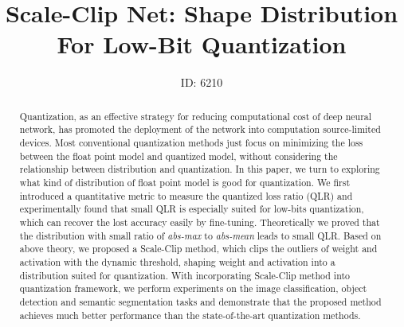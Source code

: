 \documentclass[letterpaper]{article} %
\begin{document}
%
\title{Scale-Clip Net: Shape Distribution For Low-Bit Quantization}
\author{ID: 6210
}


\maketitle
\begin{abstract}
Quantization, as an effective strategy for reducing computational cost of deep neural network, has promoted the deployment of the network into computation source-limited devices. Most conventional quantization methods just focus on minimizing the loss between the float point model and quantized model, without considering the relationship between distribution and quantization. In this paper, we turn to exploring what kind of distribution of float point model is good for quantization. We first introduced a quantitative metric to measure the quantized loss ratio (QLR) and experimentally found that small QLR is especially suited for low-bits quantization, which can recover the lost accuracy easily by fine-tuning. Theoretically we proved that the distribution with small ratio of {\it abs-max} to {\it abs-mean} leads to small QLR. Based on above theory, we proposed a Scale-Clip method, which clips the outliers of weight and activation with the dynamic threshold, shaping weight and activation into a distribution suited for quantization. With incorporating Scale-Clip method into quantization framework, we perform experiments on the image classification, object detection and semantic segmentation tasks and demonstrate that the proposed method achieves much better performance than the state-of-the-art quantization methods.


\end{abstract}
\end{document}
